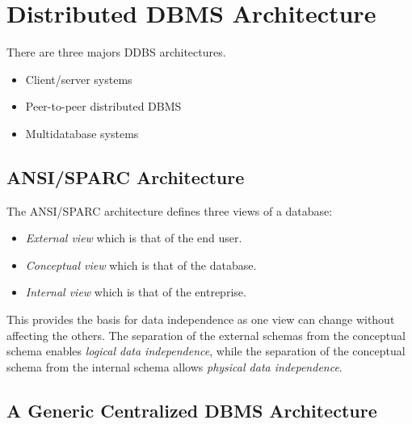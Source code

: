 \documentclass[12pt]{article}
\begin{document}
\section{Distributed DBMS Architecture}

There are three majors DDBS architectures.
\begin{itemize}
	\item Client/server systems
	\item Peer-to-peer distributed DBMS
	\item Multidatabase systems
\end{itemize}

\subsection{ANSI/SPARC Architecture}

The ANSI/SPARC architecture defines three views of a database:
\begin{itemize}
	\item \textit{External view} which is that of the end user.
	\item \textit{Conceptual view} which is that of the database.
	\item \textit{Internal view} which is that of the entreprise.
\end{itemize}

This provides the basis for data independence as one view can change without affecting the others. The separation of the external schemas from the conceptual schema enables \textit{logical data independence}, while the separation of the conceptual schema from the internal schema allows \textit{physical data independence}.

\subsection{A Generic Centralized DBMS Architecture}
\end{document}
